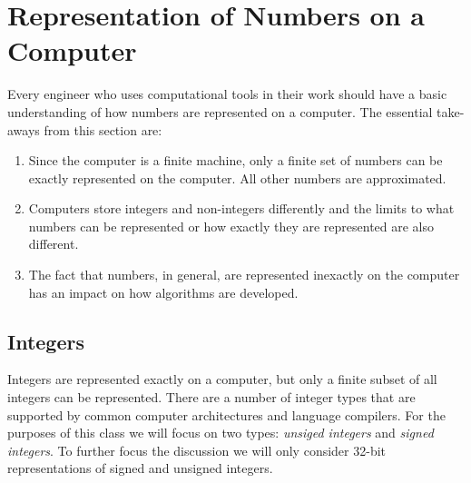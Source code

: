 \vspace{4.0cm}

\section{Representation of Numbers on a Computer}

Every engineer who uses computational tools in their work should have a basic understanding of how numbers are represented on a computer.  The essential take-aways from this section are:
\begin{enumerate}
\item Since the computer is a finite machine, only a finite set of numbers can be exactly represented on the computer.  All other numbers are approximated.
\item Computers store integers and non-integers differently and the limits to what numbers can be represented or how exactly they are represented are also different.
\item The fact that numbers, in general, are represented inexactly on the computer has an impact on how algorithms are developed.
\end{enumerate}

\subsection{Integers}
Integers are represented exactly on a computer, but only a finite subset of all integers can be represented.  There are a number of integer types that are supported by common computer architectures and language compilers. For the purposes of this class we will focus on two types: \emph{unsiged integers} and \emph{signed integers}.  To further focus the discussion we will only consider 32-bit representations of signed and unsigned integers.

